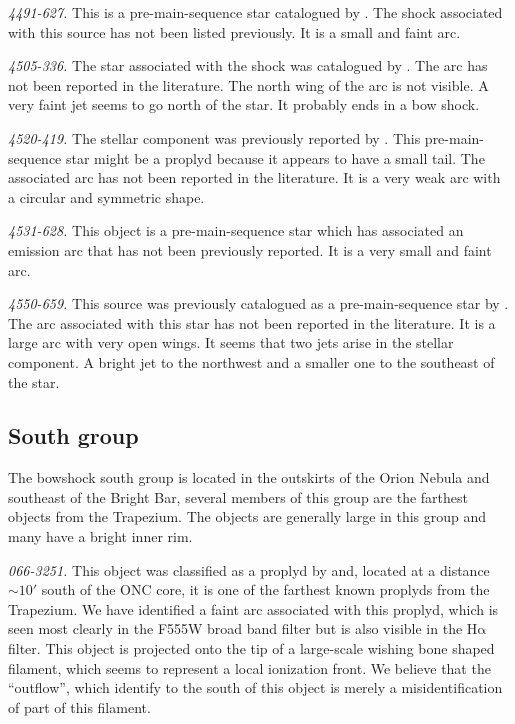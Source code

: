\documentclass[apj, twocolumn]{aastex63}
\newcommand\ha{\ensuremath{\mathrm{H\alpha}}}
\renewcommand\clearpage{}
\begin{document}
\textit{4491-627.} This is a pre-main-sequence star catalogued by
\citet{Parihar:2009}. The shock associated with this source has not been
listed previously. It is a small and faint arc.

\textit{4505-336.} The star associated with the shock was catalogued
by \citet{Hillenbrand:1997}. The arc has not been reported in the
literature. The north wing of the arc is not visible. A very faint jet
seems to go north of the star. It probably ends in a bow shock.

\textit{4520-419.} The stellar component was previously reported
by \citet{Parihar:2009}. This pre-main-sequence star might be a proplyd
because it appears to have a small tail. The associated arc has not been
reported in the literature. It is a very weak arc with a circular and
symmetric shape.

\textit{4531-628.} This object is a pre-main-sequence star \citep{Da-Rio:2009a}
which has associated an emission arc that has not been previously reported.
It is a very small and faint arc.

\textit{4550-659.} This source was previously catalogued as a pre-main-sequence
star by \citet{Parihar:2009}. The arc associated with this star has not been
reported in the literature. It is a large arc with very open wings. It seems
that two jets arise in the stellar component. A bright jet to the northwest
and a smaller one to the southeast of the star.  


\clearpage
\subsection{South group}
\label{sec:s-group}



The bowshock south group is located in the outskirts of the Orion
Nebula and southeast of the Bright Bar, several members of this
group are the farthest objects from the Trapezium. The objects
are generally large in this group and many have a bright inner rim.   

\textit{066-3251.} This object was classified as a proplyd
by \citet{Ricci:2008a} and, located at a distance \(\sim 10'\)
south of the ONC core, it is one of the farthest known proplyds
from the Trapezium. We have identified a faint arc associated
with this proplyd, which is seen most clearly in the F555W broad
band filter but is also visible in the \ha{} filter. This object
is projected onto the tip of a large-scale wishing bone shaped
filament, which seems to represent a local ionization front.
We believe that the ``outflow'', which \citet{Ricci:2008a} identify
to the south of this object is merely a misidentification of
part of this filament.  
\end{document}
